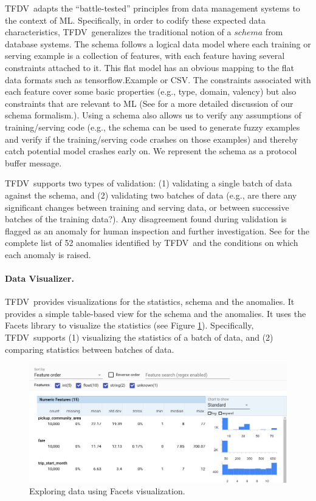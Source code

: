 \documentclass[11pt]{article}
\newcommand{\tfdv}{{\sf TFDV}}
\begin{document}
\tfdv\ adapts the “battle-tested” principles from data management systems to the context of ML. Specifically, in order to codify these expected data characteristics, \tfdv\ generalizes the traditional notion of a $schema$ from database systems. The schema follows a logical data model where each training or serving example is a collection of features, with each feature having several constraints attached to it. This flat model has an obvious mapping to the flat data formats such as tensorflow.Example or CSV. The constraints associated with each feature cover some basic properties (e.g., type, domain, valency) but also constraints that are relevant to ML (See \cite{tfdvsysml} for a more detailed discussion of our schema formalism.). Using a schema also allows us to verify any assumptions of training/serving code (e.g., the schema can be used to generate fuzzy examples and verify if the training/serving code crashes on those examples) and thereby catch potential model crashes early on. We represent the schema as a protocol buffer message.

\tfdv\ supports two types of validation: (1) validating a single batch of data against the schema, and (2) validating two batches of data (e.g., are there any significant changes between training and serving data, or between successive batches of the training data?). Any disagreement found during validation is flagged as an anomaly for human inspection and further investigation. See \cite{tfdv} for the complete list of 52 anomalies identified by \tfdv\ and the conditions on which each anomaly is raised.

\paragraph{Data Visualizer.} \tfdv\ provides visualizations for the statistics, schema and the anomalies. It provides a simple table-based view for the schema and the anomalies. It uses the Facets library \cite{facets} to visualize the statistics (see Figure \ref{stats}). Specifically, \tfdv\ supports (1) visualizing the statistics of a batch of data, and (2) comparing statistics between batches of data.

\begin{figure}[t]
  \includegraphics[width=\linewidth]{submissions/continuous-pipelines/figs/stats1.png}
  \caption{Exploring data using Facets visualization.}
  \label{stats}
\vspace{-4mm}
\end{figure}
\end{document}
